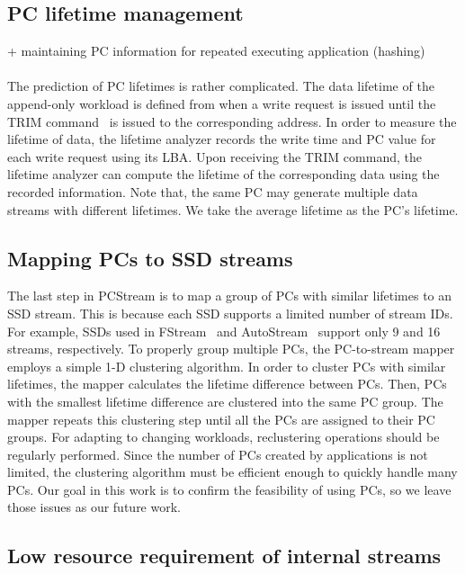\subsection{PC lifetime management}
+ maintaining PC information for repeated executing application (hashing) \\ \\
The prediction of PC lifetimes is rather complicated. 
The data lifetime of the append-only workload is defined 
from when a write request is issued until the TRIM command~\cite{TRIM} is issued to 
the corresponding address.
In order to measure the lifetime of data, the lifetime analyzer 
records the write time and PC value for each write request using its LBA.
Upon receiving the TRIM command, the lifetime analyzer can compute the 
lifetime of the corresponding data using the recorded information.
Note that, the
same PC may generate multiple data streams with different lifetimes.
We take the average lifetime as the PC's lifetime.

\subsection{Mapping PCs to SSD streams}

The last step in \textsf{\small PCStream} is to map
a group of PCs with similar lifetimes to an SSD stream.
This is because each SSD supports a limited number of stream IDs. For
example, SSDs used in \textsf{\small FStream}~\cite{FStream} and \textsf{\small AutoStream}~\cite{AutoStream}
support only 9 and 16 streams, respectively. To properly group multiple PCs,
the PC-to-stream mapper employs a simple 1-D clustering algorithm. 
In order to cluster PCs with similar lifetimes, the mapper calculates the 
lifetime difference between PCs.
Then, PCs with the smallest lifetime difference are clustered into the same PC group. 
The mapper repeats this clustering step until all the PCs are assigned to their PC groups.
For adapting to changing
workloads, reclustering operations should be regularly performed. Since the
number of PCs created by applications is not limited, the clustering algorithm
must be efficient enough to quickly handle many PCs. Our goal in this work is
to confirm the feasibility of using PCs, so we leave
those issues as our future work.

\subsection{Low resource requirement of internal streams}

